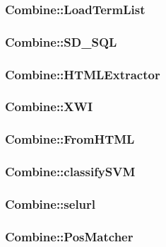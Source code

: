 \subsubsection{Combine::LoadTermList}

\htmlrule\hrulefill
\subsubsection{Combine::SD\_SQL}

\htmlrule\hrulefill
\subsubsection{Combine::HTMLExtractor}

\htmlrule\hrulefill
\subsubsection{Combine::XWI}

\htmlrule\hrulefill
\subsubsection{Combine::FromHTML}

\htmlrule\hrulefill
\subsubsection{Combine::classifySVM}

\htmlrule\hrulefill
\subsubsection{Combine::selurl}

\htmlrule\hrulefill
\subsubsection{Combine::PosMatcher}

\htmlrule\hrulefill
